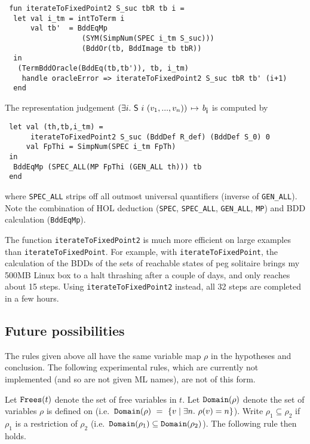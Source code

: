 \documentclass[12pt]{article}
\newcommand{\bnind}[1]{\index[MLbn]{#1}}
\newcommand{\con}[1]{\mbox{\sf #1}}
\newcommand{\ml}[1]{{\tt #1}}
\newcommand{\globtermbdd}[2]{\mbox{$#1\hspace{0.5mm}\mapsto\hspace{0.5mm}#2$}}
\newcommand\HOL{HOL\xspace}
\begin{document}
\begin{verbatim}
 fun iterateToFixedPoint2 S_suc tbR tb i =
  let val i_tm = intToTerm i
      val tb'  = BddEqMp
                  (SYM(SimpNum(SPEC i_tm S_suc)))
                  (BddOr(tb, BddImage tb tbR))
  in
   (TermBddOracle(BddEq(tb,tb')), tb, i_tm)
    handle oracleError => iterateToFixedPoint2 S_suc tbR tb' (i+1)
  end
\end{verbatim}

\vspace*{-1mm}

\noindent The representation 
judgement $\globtermbdd{(\exists i.~\con{S}~i~(v_1,...,v_n))}{b_{\con{i}}}$
is computed by

\vspace*{-1mm}

\begin{verbatim}
 let val (th,tb,i_tm) = 
      iterateToFixedPoint2 S_suc (BddDef R_def) (BddDef S_0) 0
     val FpThi = SimpNum(SPEC i_tm FpTh)
 in
  BddEqMp (SPEC_ALL(MP FpThi (GEN_ALL th))) tb
 end 
\end{verbatim}

\vspace*{-1mm}

\noindent where \ml{SPEC\_ALL}\bnind{\ml{SPEC\_ALL}} strips off all outmost universal
quantifiers (inverse of \ml{GEN\_ALL}\bnind{\ml{GEN\_ALL}}). Note the combination of \HOL{} deduction (\ml{SPEC},
\ml{SPEC\_ALL}, \ml{GEN\_ALL}, \ml{MP}) and BDD calculation (\ml{BddEqMp}).

The function \ml{iterateToFixedPoint2} is much more efficient on large
examples than \ml{iterateToFixedPoint}. For example, with
\ml{iterateToFixedPoint}, the calculation of the BDDs of the sets of
reachable states of peg solitaire brings my 500MB Linux box to a halt
thrashing after a couple of days, and only reaches about 15 steps.
Using \ml{iterateToFixedPoint2} instead, all 32 steps are completed in a few
hours.

\subsection{Future possibilities}\label{future}

The rules given above all have the same variable map $\rho$ in the
hypotheses and conclusion. The following experimental rules, which are currently
not implemented (and so are not given ML names), are not of this form.

Let $\ml{Frees}(t)$ denote the set of free variables in $t$.  
Let 
$\ml{Domain}(\rho)$ denote the set of variables $\rho$ is defined on
(i.e.~$\ml{Domain}(\rho)~=~\{v\mid \exists n.~\rho(v)=n\}$).
Write
$\rho_1\subseteq\rho_2$ if $\rho_1$ is a restriction of $\rho_2$
(i.e.~$\ml{Domain}(\rho_1)\subseteq\ml{Domain}(\rho_2)$).  
The following rule then holds.
\end{document}
